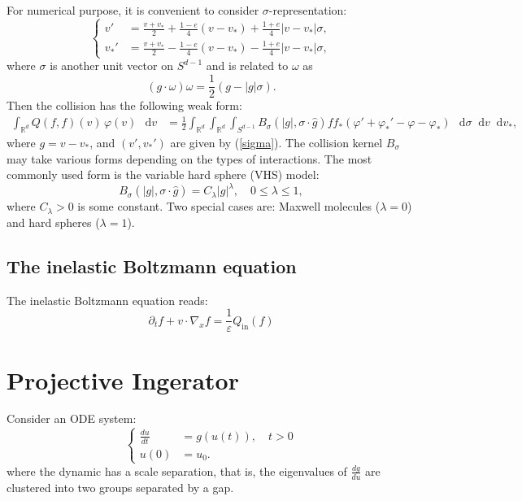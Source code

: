 \documentclass[reqno]{amsart}
\newcommand*\diff{\mathop{}\!\mathrm{d}}
\begin{document}
For numerical purpose, it is convenient to consider $\sigma$-representation:
\begin{equation} \label{sigma}
\left\{
\begin{aligned}
v'&=\frac{v+v_*}{2}+\frac{1-e}{4}(v-v_*)+\frac{1+e}{4}|v-v_*|\sigma, \\
v_*'&=\frac{v+v_*}{2}- \frac{1-e}{4}(v-v_*)-\frac{1+e}{4}|v-v_*|\sigma,
\end{aligned}\right.
\end{equation}
where $\sigma$ is another unit vector on $S^{d-1}$ and is related to $\omega$ as
\begin{equation} \label{relation}
(g\cdot \omega)\omega=\frac{1}{2}(g-|g|\sigma).
\end{equation}
Then the collision has the following weak form:
\begin{align} \label{weak22}
\int_{\mathbb{R}^d} Q(f,f)(v)\,\varphi(v)\,\diff v &=\frac{1}{2} \int_{\mathbb{R}^d} \int_{\mathbb{R}^d} \int_{S^{d-1}} B_{\sigma}(|g|,\sigma\cdot \hat{g})ff_*\left(\varphi'+\varphi_*'-\varphi-\varphi_* \right)\,\diff\sigma \diff v \diff v_*,
\end{align}
where $g=v-v_*$, and $(v',v_*')$ are given by (\ref{sigma}). The collision kernel $B_{\sigma}$ may take various forms depending on the types of interactions. The most commonly used form is the variable hard sphere (VHS) model:
\begin{equation} \label{VHS}
B_{\sigma}(|g|,\sigma\cdot \hat{g})=C_{\lambda}|g|^{\lambda}, \quad 0\leq \lambda \leq 1,
\end{equation}
where $C_{\lambda}> 0$ is some constant. Two special cases are: Maxwell molecules ($\lambda=0$) and hard spheres ($\lambda=1$).

\subsection{The inelastic Boltzmann equation}

The inelastic Boltzmann equation reads:
\begin{equation}
  \partial_t f + v\cdot\nabla_x f = \frac{1}{\varepsilon} Q_\text{in}(f)
\end{equation}


\section{Projective Ingerator}

Consider an ODE system:
\begin{equation}
  \left\{
  \begin{aligned}
  \frac{du}{dt} &= g(u(t)), \quad t>0 \\
  u(0) &= u_0.  
  \end{aligned}
  \right.
\end{equation}
where the dynamic has a scale separation, that is, the eigenvalues of $\frac{dg}{du}$ are clustered into two groups separated by a gap.
\end{document}
